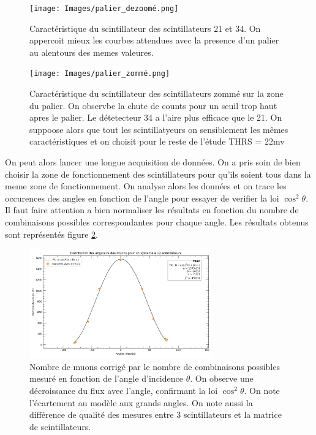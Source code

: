 \documentclass[a4paper,12pt,twoside]{article}
\begin{document}
\begin{figure}[!h]
  \begin{minipage}
  {0.45\textwidth}
    \centering
    \texttt{[image: Images/palier\_dezoomé.png]}
    \caption{Caractéristique du scintillateur des scintillateurs 21 et 34. On appercoit mieux les courbes attendues avec la presence d'un palier au alentours des memes valeures.}
    \label{fig:caracteristique_scintillateur_1}
  \end{minipage}
  \hfill
  \begin{minipage}{0.45\textwidth}
    \centering
    \texttt{[image: Images/palier\_zommé.png]}
    \caption{Caractéristique du scintillateur des scintillateurs zommé sur la zone du palier. On observbe la chute de counts pour un seuil trop haut apres le palier. Le détetecteur 34 a l'aire plus efficace que le 21. On suppoose alors que tout les scintillatyeurs on sensiblement les mêmes caractéristiques et on choisit pour le reste de l'étude THRS = 22mv}
    \label{fig:caracteristique_scintillateur_2}
  \end{minipage}
\end{figure}

On peut alors lancer une longue acquisition de données. 
On a pris soin de bien choisir la zone de fonctionnement des scintillateurs pour qu'ils soient tous dans la meme zone de fonctionnement. 
On analyse alors les données et on trace les occurences des angles en fonction de l'angle pour essayer de verifier la loi $\cos^2\theta$.
Il faut faire attention a bien normaliser les résultats en fonction du nombre de combinaisons possibles correspondantes pour chaque angle.
Les résultats obtenus sont représentés figure \ref{fig:cos2s_2}.

\begin{figure}[H]
  \centering
  \includegraphics[width=0.7\textwidth]{Images/distribution_angulaire.png}
  \caption{Nombre de muons corrigé par le nombre de combinaisons possibles mesuré en fonction de l'angle d'incidence $\theta$. On observe une décroissance du flux avec l'angle, confirmant la loi $\cos^2\theta$. On note l'écartement au modèle aux grands angles.
  On note aussi la différence de qualité des mesures entre 3 scintillateurs et la matrice de scintillateurs.}
  \label{fig:cos2s_2}
\end{figure}
\end{document}
